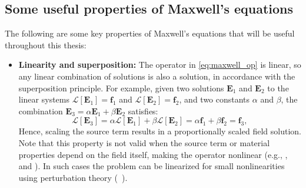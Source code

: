     \subsection*{Some useful properties of Maxwell's equations}
    The following are some key properties of Maxwell's equations that will be
    useful throughout this thesis:
    \begin{itemize}
        \item \textbf{Linearity and superposition:} The operator in
              \eqref{eq:maxwell_op} is linear, so any linear combination of solutions is
              also a solution, in accordance with the superposition principle.
              For example, given two solutions $\mathbf{E}_1$ and $\mathbf{E}_2$ to the
              linear systems $\mathcal{L}[\mathbf{E}_1] = \mathbf{f}_1$ and
              $\mathcal{L}[\mathbf{E}_2] = \mathbf{f}_2$,
              and two constants $\alpha$ and $\beta$, the combination $\mathbf{E}_3 =
                  \alpha \mathbf{E}_1 + \beta \mathbf{E}_2$ satisfies:
              \begin{equation}
                  \mathcal{L}[\mathbf{E}_3] = \alpha \mathcal{L}[\mathbf{E}_1] + \beta
                  \mathcal{L}[\mathbf{E}_2] = \alpha \mathbf{f}_1 + \beta \mathbf{f}_2 =
                  \mathbf{f}_3,
              \end{equation}
              Hence, scaling the source term results in a proportionally scaled field
              solution. Note that this property is not valid when the source term or material
              properties depend on the field itself, making the operator nonlinear (e.g., ,
               and ). In such
              cases the problem can be linearized for small nonlinearities
              using perturbation theory (~\cite{ownpub4}).


\end{itemize}
